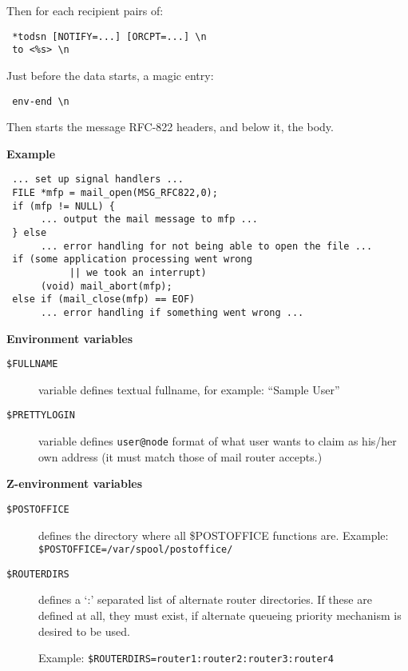 Then for each recipient pairs of:
\begin{verbatim}
 *todsn [NOTIFY=...] [ORCPT=...] \n
 to <%s> \n
\end{verbatim}


Just before the data starts, a magic entry:
\begin{verbatim}
 env-end \n
\end{verbatim}


Then starts the message RFC-822 headers, and below it, the body.

{\bf Example}

\begin{verbatim}
 ... set up signal handlers ...
 FILE *mfp = mail_open(MSG_RFC822,0);
 if (mfp != NULL) {
      ... output the mail message to mfp ...
 } else
      ... error handling for not being able to open the file ...
 if (some application processing went wrong
           || we took an interrupt)
      (void) mail_abort(mfp);
 else if (mail_close(mfp) == EOF)
      ... error handling if something went wrong ...
\end{verbatim}


{\bf Environment variables}

\begin{description}


\item[ {\tt \$FULLNAME}] \mbox{}

variable defines textual fullname, 
for example: ``Sample User''



\item[ {\tt \$PRETTYLOGIN}] \mbox{}

variable defines 
{\tt user@node} format of what user wants to claim as 
his/her own address (it must match those of mail router accepts.)

\end{description}


{\bf Z-environment variables}
\begin{description}


\item[ {\tt \$POSTOFFICE}] \mbox{}

defines the directory where all 
\$POSTOFFICE functions are. 
Example: {\tt \$POSTOFFICE=/var/spool/postoffice/}



\item[ {\tt \$ROUTERDIRS}] \mbox{}

defines a `:' separated list of alternate 
router directories. If these are defined at all, they must exist, 
if alternate queueing priority mechanism is desired to be used. 

Example: {\tt \$ROUTERDIRS=router1:router2:router3:router4}

\end{description}
